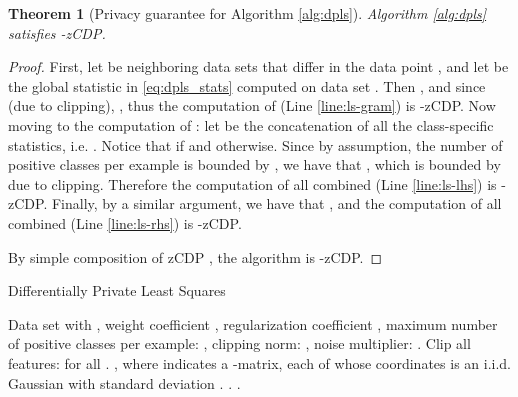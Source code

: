 \documentclass[letterpaper]{article} \usepackage{fullpage}
\newtheorem{thm}[lem]{Theorem}
\begin{document}
\begin{thm}[Privacy guarantee for Algorithm \ref{alg:dpls}]
Algorithm \ref{alg:dpls} satisfies -zCDP.
\end{thm}
\begin{proof}
First, let  be neighboring data sets that differ in the data point , and let  be the global statistic in \eqref{eq:dpls_stats} computed on data set . Then , and since  (due to clipping), , thus the computation of  (Line \ref{line:ls-gram}) is -zCDP. Now moving to the computation of : let  be the concatenation of all the class-specific statistics, i.e. . Notice that  if  and  otherwise. Since by assumption, the number of positive classes per example is bounded by , we have that , which is bounded by  due to clipping. Therefore the computation of all  combined (Line \ref{line:ls-lhs}) is -zCDP. Finally, by a similar argument, we have that , and the computation of all  combined (Line \ref{line:ls-rhs}) is -zCDP.

By simple composition of zCDP \cite{bun2016concentrated}, the algorithm is -zCDP.
\end{proof}

\begin{algorithm}[ht]
\caption{Differentially Private Least Squares}
\begin{algorithmic}[1]
\REQUIRE Data set  with , weight coefficient , regularization coefficient , maximum number of positive classes per example: , clipping norm: , noise multiplier: .
\STATE Clip all features:  for all .
{\STATE {}}, where  indicates a -matrix, each of whose coordinates is an i.i.d. Gaussian with standard deviation . \label{line:ls-gram}
\FOR{}
{\STATE {} \label{line:ls-lhs}}
\STATE . \label{line:ls-rhs}
{\STATE \label{line:ls-solution}}
\ENDFOR{}
{ \label{eq:lastDPLS}.}
\end{algorithmic}
\label{alg:dpls}
\end{algorithm}
\end{document}

